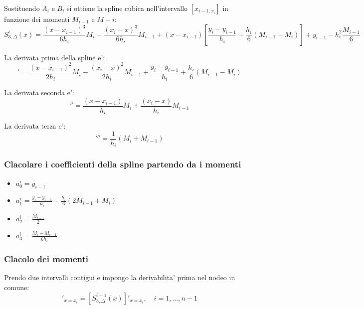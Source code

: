 Sostituendo $A_i$ e $B_i$ si ottiene la spline cubica nell'intervallo $[x_{i-1, x_i}]$ in funzione dei momenti $M_{i-1}$ e $M-i$:
\begin{equation}
  S^i_{3, \Delta}(x) = \frac{(x - x_{i-1})^3}{6h_i} M_i + \frac{(x_i - x)^3}{6h_i}M_{i-1} + (x - x_{i-1}) [\frac{y_i - y_{i-1}}{h_i} + \frac{h_i}{6}(M_{i-1} - M_i)] + y_{i-1} - h^2_i\frac{M_{i-1}}{6}
\end{equation}

La derivata prima della spline e':
\begin{equation}
[S^i_{3, \Delta}(x)]' = \frac{(x - x_{i-1})^2}{2h_i} M_i - \frac{(x_i - x)^2}{2h_i}M_{i-1} + \frac{y_i - y_{i-1}}{h_i} + \frac{h_i}{6}(M_{i-1} - M_i)
  \label{eq:derivata_prima_spline_momenti}
\end{equation}

La derivata seconda e':
\begin{equation}
  [S^i_{3, \Delta}(x)]'' = \frac{(x - x_{i-1})}{h_i} M_i + \frac{(x_i - x)}{h_i} M_{i-1} 
\end{equation}

La derivata terza e':
\begin{equation}
  [S^i_{3, \Delta}(x)]''' = \frac{1}{h_i}(M_i + M_{i-1})
\end{equation}

\subsubsection{Clacolare i coefficienti della spline partendo da i momenti}
\begin{itemize}
  \item $a^i_0 = y_{i-1}$
  \item $a^i_1 = \frac{y_i - y_{i-1}}{h_i} - \frac{h_i}{6}(2M_{i-1} + M_i)$
  \item $a^i_2 = \frac{M_{i-1}}{2}$
  \item $a^i_3 = \frac{M_i - M_{i-1}}{6h_i}$
\end{itemize}


\subsubsection{Clacolo dei momenti}
Prendo due intervalli contigui e impongo la derivabilita' prima nel nodeo in comune:
\begin{equation}
  [S^i_{3, \Delta}(x)]'_{x=x_i} = [S^{i+1}_{3, \Delta}(x)]'_{x=x_i}, \quad i = 1, \dots, n-1
\end{equation}

